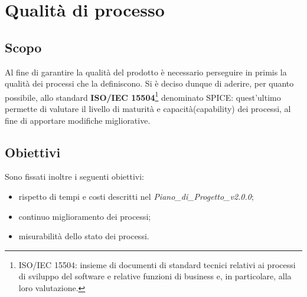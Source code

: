 \section{Qualità di processo}
\subsection{Scopo}
Al fine di garantire la qualità del prodotto è necessario perseguire in primis la qualità dei processi che la definiscono. Si è deciso dunque di aderire, per quanto possibile, allo standard \textbf{ISO/IEC 15504}\footnote{ISO/IEC 15504: insieme di documenti di standard tecnici relativi ai processi di sviluppo del software e relative funzioni di business e, in particolare, alla loro valutazione.} denominato SPICE\glo: quest'ultimo permette di valutare il livello di maturità e capacità\glo (capability) dei processi, al fine di apportare modifiche migliorative. 
\begin{comment}
Eliminato la subsection PDCA
\end{comment}
\subsection{Obiettivi}
Sono fissati inoltre i seguenti obiettivi: \begin{itemize}
\item rispetto di tempi e costi descritti nel \textit{Piano\_di\_Progetto\_v2.0.0};
\item continuo miglioramento dei processi;
\item misurabilità dello stato dei processi.
\end{itemize}
